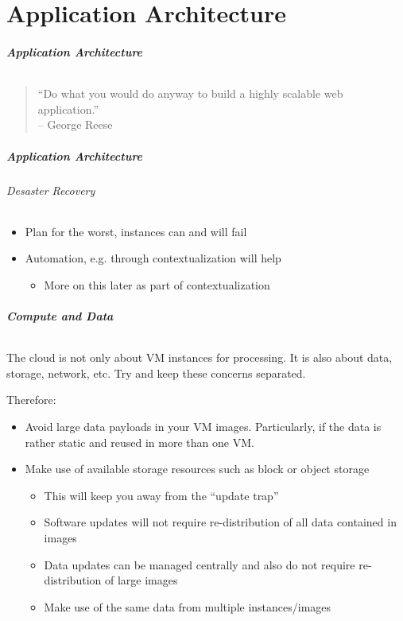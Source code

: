 \label{part_architecture}
\part{Application Architecture}

\begin{frame}
\frametitle{Application Architecture}
\framesubtitle{}
\begin{quote}
  ``Do what you would do anyway to build a highly scalable web application.''\\
  \hfill{}-- George Reese
\end{quote}
\end{frame}

\begin{frame}
\frametitle{Application Architecture}
\framesubtitle{Desaster Recovery}
\begin{itemize}
\item Plan for the worst, instances can and will fail
\item Automation, e.g. through contextualization will help
  \begin{itemize}
  \item More on this later as part of contextualization
  \end{itemize}
\end{itemize}
\end{frame}



\begin{frame}
\frametitle{Compute and Data}
\framesubtitle{}
The cloud is not only about VM instances for processing. It is
also about data, storage, network, etc. Try and keep these concerns
separated.

Therefore:
\begin{itemize}
\item Avoid large data payloads in your VM images. Particularly, if
  the data is rather static and reused in more than one VM.
\item Make use of available storage resources such as block or object
  storage
  \begin{itemize}
  \item This will keep you away from the ``update trap''
  \item Software updates will not require re-distribution of all data
    contained in images
  \item Data updates can be managed centrally and also do not require
    re-distribution of large images
  \item Make use of the same data from multiple instances/images
  \end{itemize}
\end{itemize}
\end{frame}

